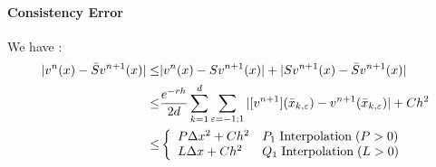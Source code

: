 \documentclass[a4paper,10pt]{article}
\begin{document}
\paragraph{Consistency Error}
We have :
\begin{align*}
|v^n(x)-\bar{S}v^{n+1}(x)|
\leq&|v^n(x)-Sv^{n+1}(x)| +|Sv^{n+1}(x)-\bar{S}v^{n+1}(x)|\\
\leq& \frac{e^{-rh}}{2d}\sum_{k=1}^d \sum_{\varepsilon={-1;1}}|[v^{n+1}](\bar{x}_{k,\varepsilon})-v^{n+1}(\bar{x}_{k,\varepsilon})| + Ch^2 \\
\leq& \left\{
\begin{array}{ll}
P\Delta x^2 +Ch^2                                    & P_1 \hspace{0.1cm}\text{Interpolation} \hspace{0.1cm} (P>0)   \\
L\Delta x+Ch^2                                            & Q_1 \hspace{0.1cm}\text{Interpolation} \hspace{0.1cm} (L>0)      \\
\end{array}\right.\\
\end{align*}
\end{document}
